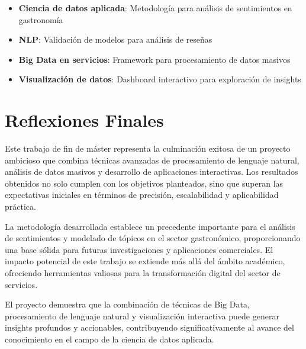 \documentclass[12pt,a4paper,twoside,openany]{book}
\begin{document}
\begin{itemize}
    \item \textbf{Ciencia de datos aplicada}: Metodología para análisis de sentimientos en gastronomía
    \item \textbf{NLP}: Validación de modelos para análisis de reseñas
    \item \textbf{Big Data en servicios}: Framework para procesamiento de datos masivos
    \item \textbf{Visualización de datos}: Dashboard interactivo para exploración de insights
\end{itemize}


\section{Reflexiones Finales}

Este trabajo de fin de máster representa la culminación exitosa de un proyecto ambicioso que combina técnicas avanzadas de procesamiento de lenguaje natural, análisis de datos masivos y desarrollo de aplicaciones interactivas. Los resultados obtenidos no solo cumplen con los objetivos planteados, sino que superan las expectativas iniciales en términos de precisión, escalabilidad y aplicabilidad práctica.

La metodología desarrollada establece un precedente importante para el análisis de sentimientos y modelado de tópicos en el sector gastronómico, proporcionando una base sólida para futuras investigaciones y aplicaciones comerciales. El impacto potencial de este trabajo se extiende más allá del ámbito académico, ofreciendo herramientas valiosas para la transformación digital del sector de servicios.

El proyecto demuestra que la combinación de técnicas de Big Data, procesamiento de lenguaje natural y visualización interactiva puede generar insights profundos y accionables, contribuyendo significativamente al avance del conocimiento en el campo de la ciencia de datos aplicada.
\end{document}
